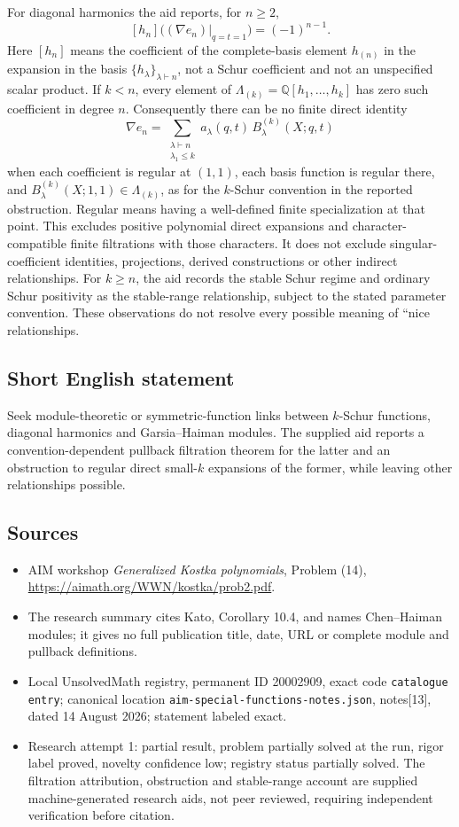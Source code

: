 \documentclass[11pt]{article}
\newcommand{\Q}{\mathbb{Q}}
\begin{document}
For diagonal harmonics the aid reports, for \(n\ge2\),
\[
[h_n]\bigl((\nabla e_n)|_{q=t=1}\bigr)=(-1)^{n-1}.
\]
Here \([h_n]\) means the coefficient of the complete-basis element \(h_{(n)}\) in the expansion in the basis \(\{h_\lambda\}_{\lambda\vdash n}\), not a Schur coefficient and not an unspecified scalar product. If \(k<n\), every element of \(\Lambda_{(k)}=\Q[h_1,\ldots,h_k]\) has zero such coefficient in degree \(n\). Consequently there can be no finite direct identity
\[
\nabla e_n=\sum_{\substack{\lambda\vdash n\\\lambda_1\le k}}a_\lambda(q,t)\,B_\lambda^{(k)}(X;q,t)
\]
when each coefficient is regular at \((1,1)\), each basis function is regular there, and \(B_\lambda^{(k)}(X;1,1)\in\Lambda_{(k)}\), as for the \(k\)-Schur convention in the reported obstruction. Regular means having a well-defined finite specialization at that point. This excludes positive polynomial direct expansions and character-compatible finite filtrations with those characters. It does not exclude singular-coefficient identities, projections, derived constructions or other indirect relationships. For \(k\ge n\), the aid records the stable Schur regime and ordinary Schur positivity as the stable-range relationship, subject to the stated parameter convention. These observations do not resolve every possible meaning of ``nice relationships.
\subsection{Short English statement}
Seek module-theoretic or symmetric-function links between \(k\)-Schur functions, diagonal harmonics and Garsia--Haiman modules. The supplied aid reports a convention-dependent pullback filtration theorem for the latter and an obstruction to regular direct small-\(k\) expansions of the former, while leaving other relationships possible.
\subsection{Sources}
\begin{itemize}
\item AIM workshop \emph{Generalized Kostka polynomials}, Problem (14), \url{https://aimath.org/WWN/kostka/prob2.pdf}.
\item The research summary cites Kato, Corollary 10.4, and names Chen--Haiman modules; it gives no full publication title, date, URL or complete module and pullback definitions.
\item Local UnsolvedMath registry, permanent ID 20002909, exact code \texttt{catalogue entry}; canonical location \texttt{aim-special-functions-notes.json}, notes[13], dated 14 August 2026; statement labeled exact.
\item Research attempt 1: partial result, problem partially solved at the run, rigor label proved, novelty confidence low; registry status partially solved. The filtration attribution, obstruction and stable-range account are supplied machine-generated research aids, not peer reviewed, requiring independent verification before citation.
\end{itemize}
\end{document}

